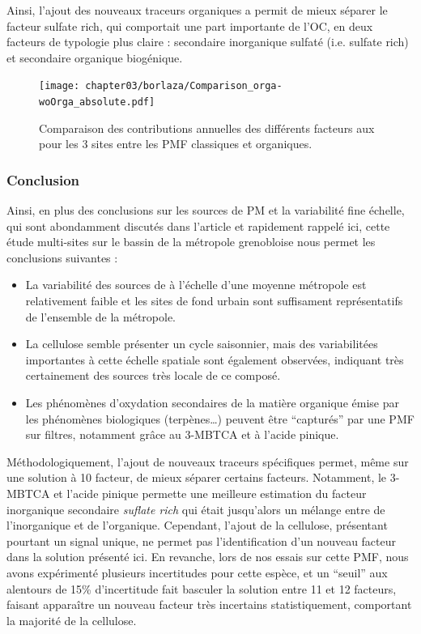 Ainsi, l'ajout des nouveaux traceurs organiques a permit de mieux séparer le facteur
sulfate rich, qui comportait une part importante de l'OC, en deux facteurs de typologie
plus claire : secondaire inorganique sulfaté (i.e. sulfate rich) et secondaire organique
biogénique.

\begin{figure}[ht]
    \centering
    \texttt{[image: chapter03/borlaza/Comparison\_orga-woOrga\_absolute.pdf]}
    \caption{Comparaison des contributions annuelles des différents facteurs aux \PMdix{}
    pour les 3 sites entre les PMF classiques et organiques.}%
    \label{fig:chapter03/borlaza/Comparison_orga-woOrga_absolute}
\end{figure}

\subsubsection{Conclusion}%
\label{ssub:conclusion}

Ainsi, en plus des conclusions sur les sources de PM et la variabilité fine échelle, qui
sont abondamment discutés dans l'article et rapidement rappelé ici, cette étude
multi-sites sur le bassin de la métropole grenobloise nous permet les conclusions
suivantes :
\begin{itemize}
    \item La variabilité des sources de \PMdix{} à l'échelle d'une moyenne métropole est
        relativement faible et les sites de fond urbain sont suffisament représentatifs
        de l'ensemble de la métropole.
    \item La cellulose semble présenter un cycle saisonnier, mais des variabilitées
        importantes à cette échelle spatiale sont également observées, indiquant très
        certainement des sources très locale de ce composé.
    \item Les phénomènes d'oxydation secondaires de la matière organique émise par les
        phénomènes biologiques (terpènes…) peuvent être ``capturés'' par une PMF sur
        filtres, notamment grâce au 3-MBTCA et à l'acide pinique.
\end{itemize}

Méthodologiquement, l'ajout de nouveaux traceurs spécifiques permet, même sur une solution
à 10 facteur, de mieux séparer certains facteurs. Notamment, le 3-MBTCA et l'acide pinique
permette une meilleure estimation du facteur inorganique secondaire \textit{suflate rich}
qui était jusqu'alors un mélange entre de l'inorganique et de l'organique.
Cependant, l'ajout de la cellulose, présentant pourtant un signal unique, ne permet pas
l'identification d'un nouveau facteur dans la solution présenté ici. En revanche, lors de
nos essais sur cette PMF, nous avons expérimenté plusieurs incertitudes pour cette espèce,
et un ``seuil'' aux alentours de 15\% d'incertitude fait basculer la solution entre 11 et
12 facteurs, faisant apparaître un nouveau facteur très incertains statistiquement,
comportant la majorité de la cellulose.

